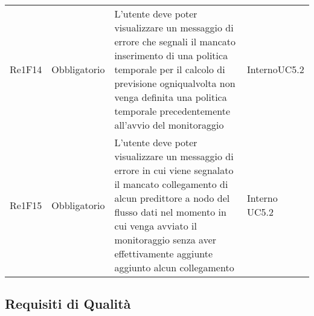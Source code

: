 \begin{longtable}{C{3cm} C{3cm} L{6.5cm} C{2.5cm}}
Re1F14 & Obbligatorio & L'utente deve poter visualizzare un messaggio di errore che segnali il mancato inserimento di una politica temporale per il calcolo di previsione ogniqualvolta non venga definita una politica temporale precedentemente all'avvio del monitoraggio &  Interno\newline UC5.2\\
Re1F15 & Obbligatorio & L'utente deve poter visualizzare un messaggio di errore in cui viene segnalato il mancato collegamento di alcun predittore a nodo del flusso dati nel momento in cui venga avviato il monitoraggio senza aver effettivamente aggiunte aggiunto alcun collegamento &  Interno\newline
UC5.2\\

\end{longtable}


\pagebreak
 	\subsection{Requisiti di Qualità}


